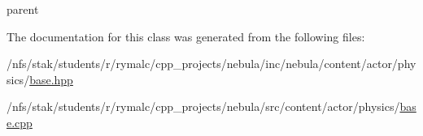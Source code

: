 parent 

The documentation for this class was generated from the following files:\begin{DoxyCompactItemize}
\item 
/nfs/stak/students/r/rymalc/cpp\_\-projects/nebula/inc/nebula/content/actor/physics/\hyperlink{inc_2nebula_2content_2actor_2physics_2base_8hpp}{base.hpp}\item 
/nfs/stak/students/r/rymalc/cpp\_\-projects/nebula/src/content/actor/physics/\hyperlink{src_2content_2actor_2physics_2base_8cpp}{base.cpp}\end{DoxyCompactItemize}
